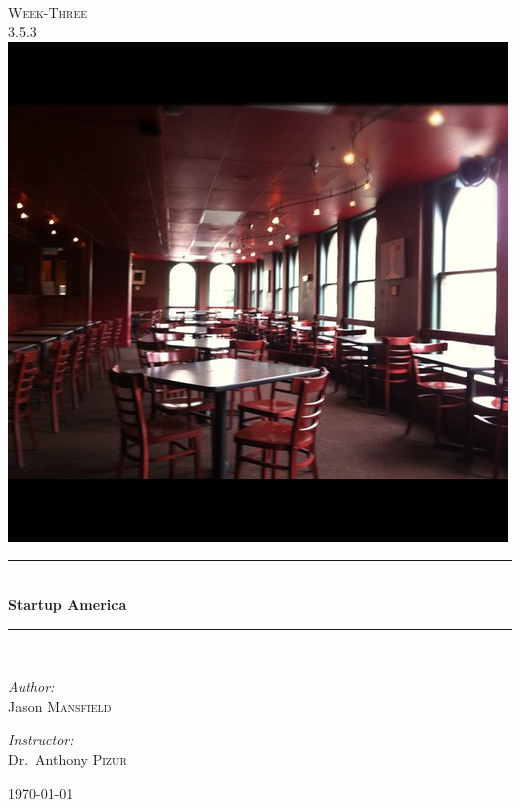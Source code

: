 \documentclass[pdftex,10pt,a4paper]{report}
\newcommand{\HRule}{\rule{\linewidth}{0.5mm}}
\begin{document}
%
\begin{titlepage}
\begin{center}


\textsc{\color{Sepia}{\LARGE EC~320}}\\[1.5cm]
\textsc{\Large Week-Three}\\[0.5cm]
\textsc{\Large 3.5.3}\\[0.5cm]
\includegraphics[scale=0.5]{GDP}\\
\HRule \\[0.4cm]
{ \huge \bfseries Startup America}\\[0.4cm]
\HRule \\[1.5cm]


\begin{minipage}{0.4\textwidth}
\begin{flushleft} \large
\emph{Author:}\\
Jason \textsc{Mansfield}
\end{flushleft}
\end{minipage}
\begin{minipage}{0.4\textwidth}
\begin{flushright} \large
\emph{Instructor:} \\
Dr.~Anthony \textsc{Pizur}
\end{flushright}
\end{minipage}

\vfill

{\large \today}

\end{center}
\end{titlepage}
\end{document}
